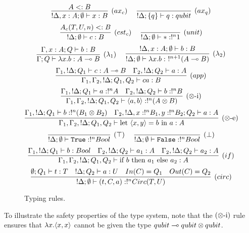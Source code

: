 \documentclass{article}
\begin{document}

\begin{figure}[!ht]
\begin{mdframed}
\[
\infer[(ax_c)]{!\Delta, x:A;\emptyset\entails x:B}{
  A<:B
}
~~~~
\infer[(ax_q)]{!\Delta;\s{q}\entails q:qubit}{
} 
\]
\[
\infer[(cst_c)]{!\Delta;\emptyset \entails c:B}{
  A_{c}(T,U,n)<:B
} 
~~~~
\infer[(unit)]{!\Delta;\emptyset\entails *:!^n 1}{
}
\]
\[
\infer[(\lambda_1)]{\Gamma;Q\entails \lambda x.b:A\loli B}{
  \Gamma,x:A;Q \entails b:B
}
~~~~
\infer[(\lambda_2)]{!\Delta;\emptyset \entails \lambda x.b:~!^{n+1}(A\loli B)}{
  !\Delta, x:A;\emptyset \entails b:B
}
\]
\[
\infer[(app)]{\Gamma_1,\Gamma_2, !\Delta;Q_1,Q_2\entails ca:B}{
  \Gamma_1, !\Delta;Q_1\entails c:A\loli B 
  &
  \Gamma_2, !\Delta ;Q_2\entails a:A 
}
\]
\[
\infer[(\x\mbox{-i})]{\Gamma_1,\Gamma_2, !\Delta;Q_1,Q_2\entails \p{a,b}:!^n(A\x B)}{
  \Gamma_1, !\Delta;Q_1\entails a:!^nA 
  &
  \Gamma_2, !\Delta ;Q_2\entails b:!^nB
}
\]
\[
\infer[(\x\mbox{-e})]{\Gamma_1,\Gamma_2, !\Delta;Q_1,Q_2\entails \letin{\p{x,y}}{b}{a}:A}{
  \Gamma_1, !\Delta;Q_1\entails b:!^n(B_1\x B_2) 
  &
  \Gamma_2, !\Delta, x:!^nB_1, y:!^nB_2 ;Q_2\entails a:A
}
\]
\[
\infer[(\top)]{!\Delta;\emptyset\entails \true:!^n Bool}{
} 
~~~~
\infer[(\bot)]{!\Delta;\emptyset\entails \false:!^n Bool}{
}
\]
\[
\infer[(if)]{\Gamma_1,\Gamma_2, !\Delta;Q_1,Q_2\entails \ifthenelse{b}{a_1}{a_2}:A}{
  \Gamma_1, !\Delta;Q_1\entails b:Bool 
  &
  \Gamma_2, !\Delta;Q_2 \entails a_1:A ~~~ \Gamma_2, !\Delta;Q_2 \entails a_2:A
}
\]
\[
\infer[(circ)]{!\Delta;\emptyset \entails (t,C,a):!^nCirc(T,U)}{
  \emptyset ; Q_1\entails t:T 
  &
  !\Delta ; Q_2\entails a:U 
  &
  In(C)=Q_1 
  &
  Out(C)=Q_2
}
\]
\end{mdframed}
\caption{Typing rules.}
\label{trules}
\end{figure}

To illustrate the safety properties of the type system, 
note that the $(\otimes\mbox{-i})$ rule ensures that 
$\lambda x. \langle x,x\rangle$ cannot be given the type 
$qubit\multimap qubit \otimes qubit$.
\end{document}
